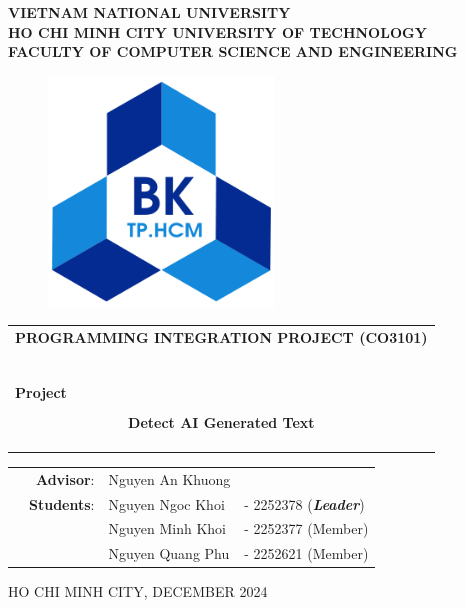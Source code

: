 \begin{titlepage}
    \begin{center}
    \textbf{VIETNAM NATIONAL UNIVERSITY \\
    HO CHI MINH CITY UNIVERSITY OF TECHNOLOGY \\
    FACULTY OF COMPUTER SCIENCE AND ENGINEERING}
    \end{center}
    
    \begin{figure}[h!]
    \begin{center}
    \includegraphics[width=6cm]{hcmut.png}
    \end{center}
    \end{figure}
    
    \begin{center}
    \begin{tabular}{c}
    \multicolumn{1}{l}{\textbf{{\Large PROGRAMMING INTEGRATION PROJECT (CO3101)}}}\\
    ~~\\
    \hline
    \\
    \multicolumn{1}{l}{\textbf{{\Large Project}}}\\
    \\
    \textbf{{\Huge Detect AI Generated Text}}\\
    \\
    \textbf{{\Huge}}\\
    \\
    \hline
    \end{tabular}
    \end{center}
    
    \begin{table}[h]
    \begin{tabular}{rrll}
    \hspace{5 cm} & \textbf{Advisor}: & Nguyen An Khuong & \\
    & \textbf{Students}: & Nguyen Ngoc Khoi &- 2252378 (\textbf{\textit{Leader}})  \\
    & & Nguyen Minh Khoi &- 2252377 (Member) \\
    & & Nguyen Quang Phu &- 2252621 (Member) \\
    \end{tabular}
    \end{table}
    
    
    
    
    \begin{center}
    {\footnotesize HO CHI MINH CITY, DECEMBER 2024}
    \end{center}
\end{titlepage}